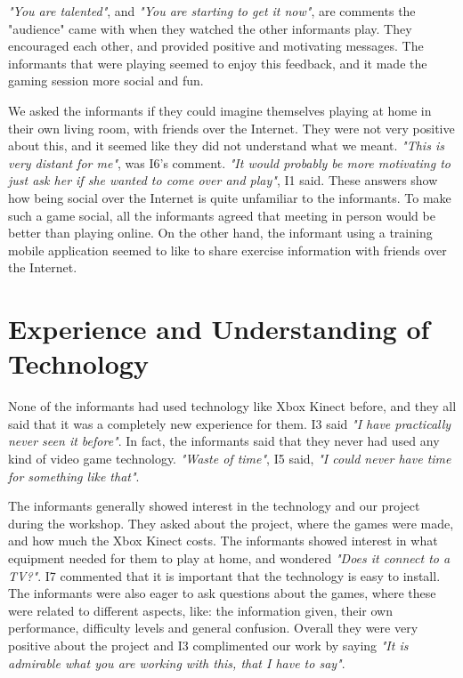 \emph{"You are talented"}, and \emph{"You are starting to get it now"}, are comments the "audience" came with when they watched the other informants play. They encouraged each other, and provided positive and motivating messages. The informants that were playing seemed to enjoy this feedback, and it made the gaming session more social and fun.  

We asked the informants if they could imagine themselves playing at home in their own living room, with friends over the Internet. They were not very positive about this, and it seemed like they did not understand what we meant. \emph{"This is very distant for me"}, was I6's comment. \emph{"It would probably be more motivating to just ask her if she wanted to come over and play"}, I1 said. These answers show how being social over the Internet is quite unfamiliar to the informants. To make such a game social, all the informants agreed that meeting in person would be better than playing online. On the other hand, the informant using a training mobile application seemed to like to share exercise information with friends over the Internet.

\section{Experience and Understanding of Technology}
None of the informants had used technology like Xbox Kinect before, and they all said that it was a completely new experience for them. I3 said \emph{"I have practically never seen it before"}. In fact, the informants said that they never had used any kind of video game technology. \emph{"Waste of time"}, I5 said, \emph{"I could never have time for something like that"}.  

The informants generally showed interest in the technology and our project during the workshop. They asked about the project, where the games were made, and how much the Xbox Kinect costs. The informants showed interest in what equipment needed for them to play at home, and wondered \emph{"Does it connect to a TV?"}. I7 commented that it is important that the technology is easy to install. The informants were also eager to ask questions about the games, where these were related to different aspects, like: the information given, their own performance, difficulty levels and general confusion. Overall they were very positive about the project and I3 complimented our work by saying \emph{"It is admirable what you are working with this, that I have to say"}. 

